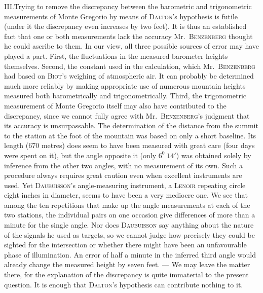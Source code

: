 III.\quad Trying to remove the discrepancy between the barometric and trigonometric measurements of Monte Gregorio by means of \textsc{Dalton}’s hypothesis is futile (under it the discrepancy even increases by two feet). It is thus an established fact that one or both measurements lack the accuracy Mr.\ \textsc{Benzenberg} thought he could ascribe to them. In our view, all three possible sources of error may have played a part. First, the fluctuations in the measured barometer heights themselves. Second, the constant used in the calculation, which Mr.\ \textsc{Benzenberg} had based on \textsc{Biot}’s weighing of atmospheric air. It can probably be determined much more reliably by making appropriate use of numerous mountain heights measured both barometrically and trigonometrically. Third, the trigonometric measurement of Monte Gregorio itself may also have contributed to the discrepancy, since we cannot fully agree with Mr.\ \textsc{Benzenberg}’s judgment that its accuracy is unsurpassable. The determination of the distance from the summit to the station at the foot of the mountain was based on only a short baseline. Its length (670 metres) does seem to have been measured with great care (four days were spent on it), but the angle opposite it (only $6^0\;14'$) was obtained solely by inference from the other two angles, with no measurement of its own. Such a procedure always requires great caution even when excellent instruments are used. Yet \textsc{Daubuisson}’s angle-measuring instrument, a \textsc{Lenoir} repeating circle eight inches in diameter, seems to have been a very mediocre one. We see that among the ten repetitions that make up the angle measurements at each of the two stations, the individual pairs on one occasion give differences of more than a minute for the single angle. Nor does \textsc{Daubuisson} say anything about the nature of the signals he used as targets, so we cannot judge how precisely they could be sighted for the intersection or whether there might have been an unfavourable phase of illumination. An error of half a minute in the inferred third angle would already change the measured height by seven feet. — We may leave the matter there, for the explanation of the discrepancy is quite immaterial to the present question. It is enough that \textsc{Dalton}’s hypothesis can contribute nothing to it.

